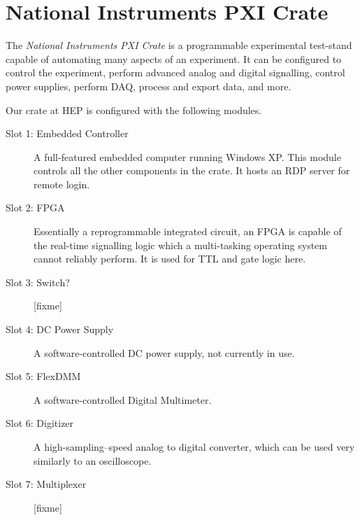 \section{National Instruments PXI Crate}
\label{sec:pxi}

The \textit{National Instruments \gls{PXI Crate}} is a programmable experimental test-stand capable of automating many aspects of an experiment.  It can be configured to control the experiment, perform advanced analog and digital signalling, control power supplies, perform \gls{DAQ}, process and export data, and more.

Our crate at HEP is configured with the following modules.
\begin{description}
\item[Slot 1: Embedded Controller] A full-featured embedded computer running Windows XP.  This module controls all the other components in the crate.  It hosts an RDP server for remote login.
\item[Slot 2: \gls{FPGA}] Essentially a reprogrammable integrated circuit, an \gls{FPGA} is capable of the real-time signalling logic which a multi-tasking operating system cannot reliably perform.  It is used for TTL and gate logic here.
\item[Slot 3: Switch?] [fixme]
\item[Slot 4: DC Power Supply] A software-controlled DC power supply, not currently in use.
\item[Slot 5: FlexDMM] A software-controlled Digital Multimeter.
\item[Slot 6: Digitizer] A high-sampling--speed analog to digital converter, which can be used very similarly to an oscilloscope.
\item[Slot 7: Multiplexer] [fixme]
\end{description}